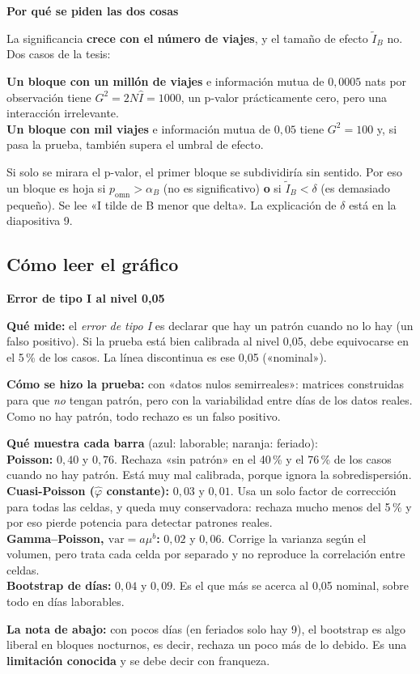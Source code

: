 \documentclass[11pt,a4paper]{article}
\newcommand{\cajainicio}[3]{\par\medskip\noindent
  \begin{lrbox}{\cajabox}\begin{minipage}{\dimexpr\linewidth-2\fboxsep-2\fboxrule\relax}%
  \textbf{\color{#1}#3}\par\smallskip}
\newcommand{\cajafin}[2]{\end{minipage}\end{lrbox}\fcolorbox{#1}{#2}{\usebox{\cajabox}}\par\medskip}
\newenvironment{nota}[1]{\cajainicio{acc}{acc!7}{#1}}{\cajafin{acc}{acc!7}}
\begin{document}
\begin{nota}{Por qué se piden las dos cosas}
La significancia \textbf{crece con el número de viajes}, y el tamaño de efecto $\tilde I_B$ no. Dos casos de la tesis:

\textbf{Un bloque con un millón de viajes} e información mutua de $0{,}0005$ nats por observación tiene $G^2=2N\hat I=1000$, un p-valor prácticamente cero, pero una interacción irrelevante.\\
\textbf{Un bloque con mil viajes} e información mutua de $0{,}05$ tiene $G^2=100$ y, si pasa la prueba, también supera el umbral de efecto.

Si solo se mirara el p-valor, el primer bloque se subdividiría sin sentido. Por eso un bloque es hoja si $p_{\mathrm{omn}}>\alpha_B$ (no es significativo) \textbf{o} si $\tilde I_B<\delta$ (es demasiado pequeño). Se lee «I tilde de B menor que delta». La explicación de $\delta$ está en la diapositiva 9.
\end{nota}

\subsection*{Cómo leer el gráfico}

\begin{nota}{Error de tipo I al nivel 0,05}
\textbf{Qué mide:} el \emph{error de tipo I} es declarar que hay un patrón cuando no lo hay (un falso positivo). Si la prueba está bien calibrada al nivel 0,05, debe equivocarse en el 5\,\% de los casos. La línea discontinua es ese 0,05 («nominal»).

\textbf{Cómo se hizo la prueba:} con «datos nulos semirreales»: matrices construidas para que \emph{no} tengan patrón, pero con la variabilidad entre días de los datos reales. Como no hay patrón, todo rechazo es un falso positivo.

\textbf{Qué muestra cada barra} (azul: laborable; naranja: feriado):\\
\textbf{Poisson:} $0{,}40$ y $0{,}76$. Rechaza «sin patrón» en el 40\,\% y el 76\,\% de los casos cuando no hay patrón. Está muy mal calibrada, porque ignora la sobredispersión.\\
\textbf{Cuasi-Poisson ($\hat\varphi$ constante):} $0{,}03$ y $0{,}01$. Usa un solo factor de corrección para todas las celdas, y queda muy conservadora: rechaza mucho menos del 5\,\% y por eso pierde potencia para detectar patrones reales.\\
\textbf{Gamma--Poisson, $\mathrm{var}=a\mu^b$:} $0{,}02$ y $0{,}06$. Corrige la varianza según el volumen, pero trata cada celda por separado y no reproduce la correlación entre celdas.\\
\textbf{Bootstrap de días:} $0{,}04$ y $0{,}09$. Es el que más se acerca al 0,05 nominal, sobre todo en días laborables.

\textbf{La nota de abajo:} con pocos días (en feriados solo hay 9), el bootstrap es algo liberal en bloques nocturnos, es decir, rechaza un poco más de lo debido. Es una \textbf{limitación conocida} y se debe decir con franqueza.
\end{nota}
\end{document}
